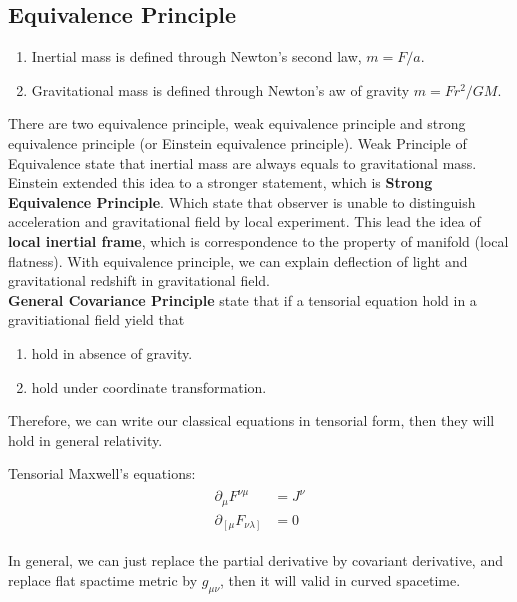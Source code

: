 \documentclass[12pt]{article}
\theoremstyle{mystyle}{\newtheorem{definition}{Definition}[section]}
\theoremstyle{mystyle}{\newtheorem{theorem}[definition]{Theorem}}
\theoremstyle{mystyle}{\newtheorem*{remark}{Remark}}
\theoremstyle{mystyle}{\newtheorem*{example}{Example}}
\theoremstyle{mystyle}{\newtheorem*{examples}{Examples}}
\theoremstyle{cstyle}{\newtheorem*{cthm}{}}
\begin{document}
\subsection{Equivalence Principle}
\begin{definition}
  \textbf{  }
  \begin{enumerate}
    \item Inertial mass is defined through Newton's second law, \(m = F/a\).
    \item Gravitational mass is defined through Newton's aw of gravity \(m = Fr^2/GM\).
  \end{enumerate}
\end{definition}
There are two equivalence principle, weak equivalence principle and strong equivalence principle
(or Einstein equivalence principle). Weak Principle of Equivalence state that inertial mass are always equals to gravitational mass.
Einstein extended this idea to a stronger statement, which is \textbf{Strong Equivalence Principle}.
Which state that observer is unable to distinguish acceleration and gravitational field by local experiment.
This lead the idea of \textbf{local inertial frame}, which is correspondence to the property of manifold (local flatness).
With equivalence principle, we can explain deflection of light and gravitational redshift in gravitational field.\\
\textbf{General Covariance Principle} state that if a tensorial equation hold in a gravitiational field yield that
\begin{enumerate}
  \item hold in absence of gravity.
  \item hold under coordinate transformation.
\end{enumerate}
Therefore, we can write our classical equations in tensorial form, then they will hold in general relativity.
\begin{example}
  Tensorial Maxwell's equations:
  \begin{align*}
    \begin{split}
      \partial_{\mu}F^{\nu\mu} &= J^{\nu}\\
      \partial_{\left[ \mu\right.}F_{\left. \nu\lambda \right]} &= 0
    \end{split}
  \end{align*}
\end{example}
In general, we can just replace the partial derivative by covariant derivative, and replace flat spactime metric by \(g_{\mu\nu}\), 
then it will valid in curved spacetime.
\end{document}
